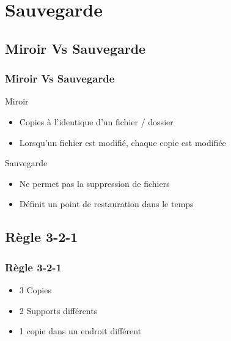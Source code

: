 
\section{Sauvegarde}

\subsection{Miroir Vs Sauvegarde}
\begin{frame}
\frametitle{Miroir Vs Sauvegarde}

Miroir
\begin{itemize}
    \item Copies à l'identique d'un fichier / dossier
    \item Lorsqu'un fichier est modifié, chaque copie est modifiée
\end{itemize}

Sauvegarde
\begin{itemize}
    \item Ne permet pas la suppression de fichiers
    \item Définit un point de restauration dans le temps
\end{itemize}

\end{frame}

\subsection{Règle 3-2-1}
\begin{frame}
\frametitle{Règle 3-2-1}

\begin{itemize}
    \item 3 Copies
    \item 2 Supports différents
    \item 1 copie dans un endroit différent
\end{itemize}

\end{frame}



